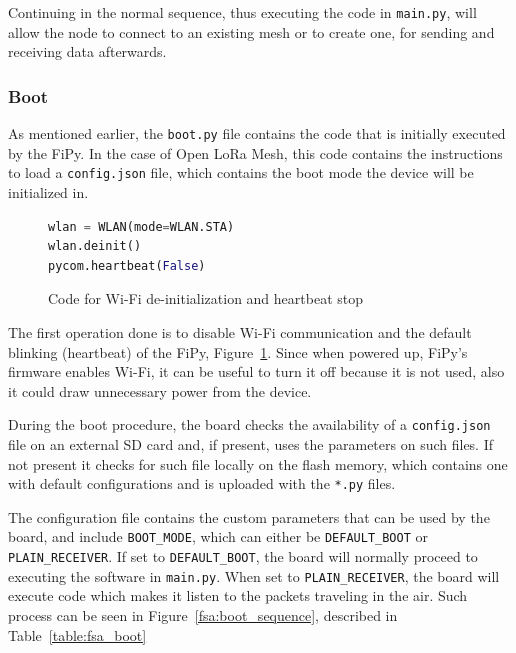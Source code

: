 				Continuing in the normal sequence, thus executing the code in \texttt{main.py}, will allow the node to connect to an existing mesh or to create one, for sending and receiving data afterwards.
				
				
			\subsubsection{Boot}
			
				As mentioned earlier, the \texttt{boot.py} file contains the code that is initially executed by the FiPy.
				In the case of Open LoRa Mesh, this code contains the instructions to load a \texttt{config.json} file, which contains the boot mode the device will be initialized in.

				\begin{figure}[H]
					\begin{lstlisting}[language=Python]
wlan = WLAN(mode=WLAN.STA)
wlan.deinit()
pycom.heartbeat(False)
					\end{lstlisting}
					\caption{Code for Wi-Fi de-initialization and heartbeat stop}
					\label{code:boot_wifi}
				\end{figure}
			
				The first operation done is to disable Wi-Fi communication and the default blinking (heartbeat) of the FiPy, Figure~\ref{code:boot_wifi}.
				Since when powered up, FiPy's firmware enables Wi-Fi, it can be useful to turn it off because it is not used, also it could draw unnecessary power from the device.
			
				During the boot procedure, the board checks the availability of a \texttt{config.json} file on an external SD card and, if present, uses the parameters on such files.
				If not present it checks for such file locally on the flash memory, which contains one with default configurations and is uploaded with the \texttt{*.py} files.

				The configuration file contains the custom parameters that can be used by the board, and
				include \texttt{BOOT\_MODE}, which can either be \texttt{DEFAULT\_BOOT} or \texttt{PLAIN\_RECEIVER}.
				If set to \texttt{DEFAULT\_BOOT}, the board will normally proceed to executing the software in \texttt{main.py}.
				When set to \texttt{PLAIN\_RECEIVER}, the board will execute code which makes it listen to the packets traveling in the air.
				Such process can be seen in Figure~\ref{fsa:boot_sequence}, described in Table~\ref{table:fsa_boot}
				
